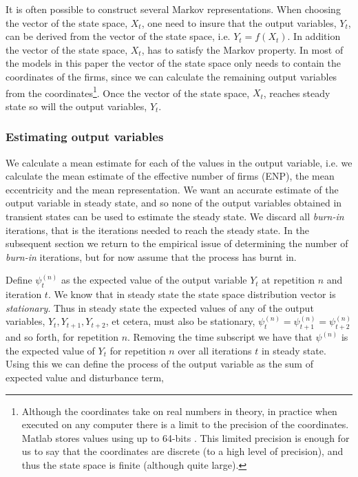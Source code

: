 \documentclass[preprint, 12pt]{elsarticle}
\begin{document}
It is often possible to construct several Markov representations. When choosing the vector of the state space, $X_t$, one need to insure that the output variables, $Y_t$, can be derived from the vector of the state space, i.e. $Y_t = f(X_t)$. In addition the vector of the state space, $X_t$, has to satisfy the Markov property. In most of the models in this paper the vector of the state space only needs to contain the coordinates of the firms, since we can calculate the remaining output variables from the coordinates\footnote{Although the coordinates take on real numbers in theory, in practice when executed on any computer there is a limit to the precision of the coordinates. Matlab stores values using up to 64-bits \citep{MathWorks_2016}. This limited precision is enough for us to say that the coordinates are discrete (to a high level of precision), and thus the state space is finite (although quite large).}. Once the vector of the state space, $X_t$, reaches steady state so will the output variables, $Y_t$.

\subsubsection{Estimating output variables}

We calculate a mean estimate for each of the values in the output variable, i.e. we calculate the mean estimate of the effective number of firms (ENP), the mean eccentricity and the mean representation. We want an accurate estimate of the output variable in steady state, and so none of the output variables obtained in transient states can be used to estimate the steady state. We discard all \emph{burn-in} iterations, that is the iterations needed to reach the steady state. In the subsequent section we return to the empirical issue of determining the number of \emph{burn-in} iterations, but for now assume that the process has burnt in.

Define $\psi_t^{(n)}$ as the expected value of the output variable $Y_t$ at repetition $n$ and iteration $t$. We know that in steady state the state space distribution vector is \emph{stationary}. Thus in steady state the expected values of any of the output variables, $Y_t, Y_{t+1}, Y_{t+2}$, et cetera, must also be stationary, $\psi_t^{(n)} = \psi_{t+1}^{(n)} = \psi_{t+2}^{(n)}$ and so forth, for repetition $n$. Removing the time subscript we have that $\psi^{(n)}$ is the expected value of $Y_t$ for repetition $n$ over all iterations $t$ in steady state. Using this we can define the process of the output variable as the sum of expected value and disturbance term, 
\end{document}
